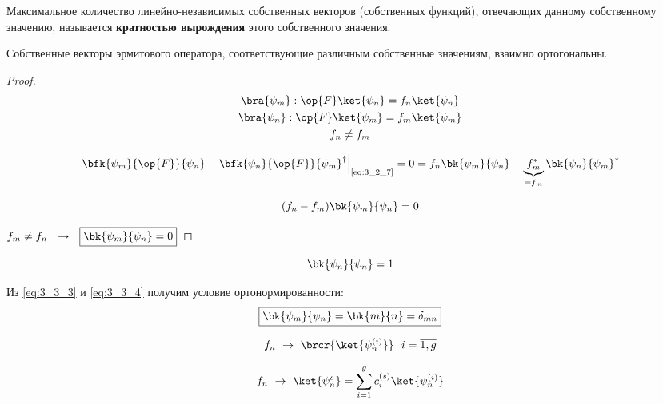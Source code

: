\begin{defn}
Максимальное количество линейно-независимых собственных векторов (собственных функций), отвечающих данному собственному значению, называется \textbf{кратностью вырождения} этого собственного значения.
\end{defn}

\begin{stmt}
Собственные векторы эрмитового оператора, соответствующие различным собственные значениям, взаимно ортогональны.
\end{stmt}
\begin{proof}

\begin{equation}
\label{eq:3_3_2}
	\begin{gathered}
		\bra{\psi_m}: \op{F}\ket{\psi_n} = f_n \ket{\psi_n} \\
		\bra{\psi_n}: \op{F}\ket{\psi_m} = f_m \ket{\psi_m} \\
		f_n \neq f_m
	\end{gathered}
\end{equation}

$$
\left. \bfk{\psi_m}{\op{F}}{\psi_n} - \bfk{\psi_n}{\op{F}}{\psi_m}^\dag \right|_{\text{\eqref{eq:3_2_7}}} = 0 = f_n \bk{\psi_m}{\psi_n} - \underbrace{f_m^*}_{= f_m} \bk{\psi_n}{\psi_m}^*
$$

\begin{equation}
\label{eq:3_3_3}
(f_n - f_m) \bk{\psi_m}{\psi_n} = 0
\end{equation}

$f_m \neq f_n ~~\to~~ \boxed{\bk{\psi_m}{\psi_n} = 0}$

\end{proof}

\begin{equation}
\label{eq:3_3_4}
\bk{\psi_n}{\psi_n} = 1
\end{equation}

Из \eqref{eq:3_3_3} и \eqref{eq:3_3_4} получим условие ортонормированности:
\begin{equation}
\label{eq:3_3_5}
\boxed{
	\bk{\psi_m}{\psi_n} = \bk{m}{n} = \delta_{mn}
}
\end{equation}

$$
f_n ~\to~ \brcr{\ket{\psi_n^{(i)}}} ~~ i = \overline{1,g}
$$

\begin{equation}
\label{eq:3_3_6}
f_n ~\to~ \ket{\psi_n^s} = \sum_{i=1}^{g} c_i^{(s)} \ket{\psi_n^{(i)}}
\end{equation}

